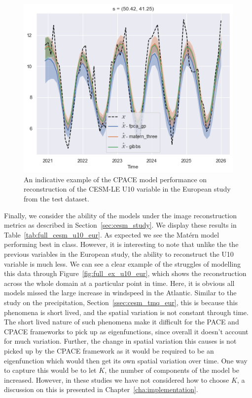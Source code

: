 \begin{figure}
	\centering
	\includegraphics[width=\textwidth]{test_ex_u10_eur}
	\caption[An indicative example of the CPACE model performance on reconstruction of the CESM-LE U10 variable in the European study from the test dataset.]{An indicative example of the CPACE model performance on reconstruction of the CESM-LE U10 variable in the European study from the test dataset.}
	\label{fig:test_ex_u10_eur}
\end{figure}

Finally, we consider the ability of the models under the image reconstruction metrics as described in Section~\ref{sec:cesm_study}.
We display these results in Table~\ref{tab:full_cesm_u10_eur}.
As expected we see the Mat\'ern model performing best in class.
However, it is interesting to note that unlike the the previous variables in the European study, the ability to reconstruct the U10 variable is much less.
We can see a clear example of the struggles of modelling this data through Figure~\ref{fig:full_ex_u10_eur}, which shows the reconstruction across the whole domain at a particular point in time.
Here, it is obvious all models missed the large increase in windspeed in the Atlantic.
Similar to the study on the precipitation, Section~\ref{ssec:cesm_tmq_eur}, this is because this phenomena is short lived, and the spatial variation is not constant through time.
The short lived nature of such phenomena make it difficult for the PACE and CPACE frameworks to pick up as eigenfunctions, since overall it doesn't account for much variation. 
Further, the change in spatial variation this causes is not picked up by the CPACE framework as it would be required to be an eigenfunction which would then get its own spatial variation over time. 
One way to capture this would be to let $K$, the number of components of the model be increased.
However, in these studies we have not considered how to choose $K$, a discussion on this is presented in Chapter~\ref{cha:implementation}.

